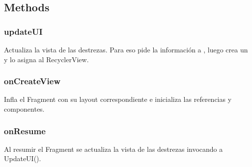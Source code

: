 \documentclass[letterpaper,10pt,english]{sphinxmanual}
\begin{document}
\subsection{Methods}
\label{Fragments/SkillsFragment:methods}

\subsubsection{updateUI}
\label{Fragments/SkillsFragment:updateui}

\begin{fulllineitems}
\label{Fragments/SkillsFragment:com.fiuba.tallerii.jobify.SkillsFragment.updateUI()}
Actualiza la vista de las destrezas. Para eso pide la información a , luego crea un  y lo asigna al RecyclerView.

\end{fulllineitems}



\subsubsection{onCreateView}
\label{Fragments/SkillsFragment:oncreateview}

\begin{fulllineitems}
\label{Fragments/SkillsFragment:com.fiuba.tallerii.jobify.SkillsFragment.onCreateView(LayoutInflater, ViewGroup, Bundle)}
Infla el Fragment con su layout correspondiente e inicializa las referencias y componentes.

\end{fulllineitems}



\subsubsection{onResume}
\label{Fragments/SkillsFragment:onresume}

\begin{fulllineitems}
\label{Fragments/SkillsFragment:com.fiuba.tallerii.jobify.SkillsFragment.onResume()}
Al resumir el Fragment se actualiza la vista de las destrezas invocando a UpdateUI().

\end{fulllineitems}
\end{document}
